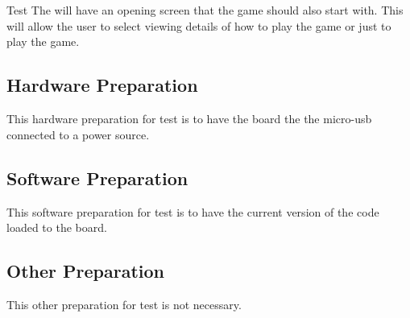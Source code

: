 
\section{\StsTestID}
\label{loc:Prep\StsTestID}


Test \StsTestID{} {The \ThisSys will have an opening screen that the game should also start with. This will allow the user to select viewing details of how to play the game or just to play the game.}


\subsection{Hardware Preparation}
\label{loc:HardwarePrep\StsTestID}


This hardware preparation for test \StsTestID{} is to have the board the the micro-usb connected to a power source.

\subsection{Software Preparation}
\label{loc:SoftwarePrep\StsTestID}


This software preparation for test \StsTestID{} is to have the current version of the code loaded to the board.

\subsection{Other Preparation}
\label{loc:OtherPrep\StsTestID}


This other preparation for test \StsTestID{} is not necessary.

